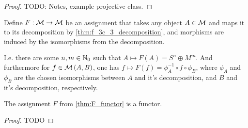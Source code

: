 \begin{lemma}
\begin{enumerate}
{\begin{center}
            \end{center}
        }
    \end{enumerate}
\end{lemma}
\begin{proof}
    TODO: Notes, example projective class.
\end{proof}





\begin{definition} \label{thm:F_functor} %
    Define \( F: {\mathcal{M}} \to {\mathcal{M}} \) be an assignment that takes any object \( A \in {\mathcal{M}} \) and maps it to its decomposition by \autoref{thm:f_3c_3_decomposition}, and morphisms are induced by the isomorphisms from the decomposition. 
    
    I.e. there are some \( n, m \in {\mathbb{N}}_0 \) such that \( A \mapsto F(A) = S^n \oplus M^m \). And furthermore for \( f \in {\mathcal{M}}\left( A, B \right) \), one has \( f \mapsto F(f) = \phi_A^{-1} \circ f \circ \phi_B \), where \( \phi_A \) and \( \phi_B \) are the chosen isomorphisms between \( A \) and it's decomposition, and \( B \) and it's decomposition, respectively.
\end{definition}

\begin{lemma}
    The assignment \( F \) from \autoref{thm:F_functor} is a functor.
\end{lemma}
\begin{proof}
    TODO
\end{proof}

